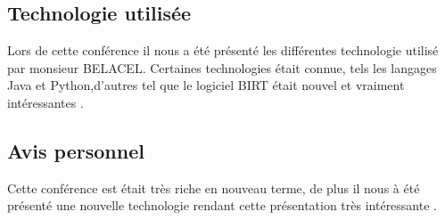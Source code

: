  	\subsection{Technologie utilisée} %
 		Lors de cette conférence il nous a été présenté les différentes technologie utilisé par monsieur BELACEL. Certaines technologies était connue, tels les langages Java et Python,d'autres tel que le logiciel BIRT était nouvel et vraiment intéressantes . 

 	\subsection{Avis personnel} 
 	Cette conférence est était très riche en nouveau terme, de plus il nous à été présenté une nouvelle technologie rendant cette présentation très intéressante . 